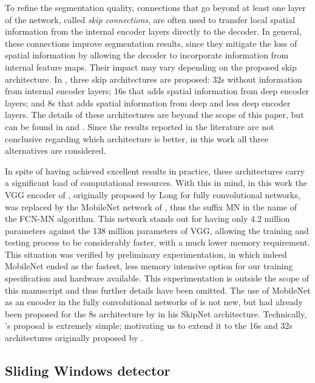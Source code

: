 \documentclass[a4paper,authoryear,review]{elsarticle}
\begin{document}
To refine the segmentation quality, connections that go beyond at least one layer of the network, called \emph{skip connections}, are often used to transfer local spatial information from the internal encoder layers directly to the decoder. In general, these connections improve segmentation results, since they mitigate the loss of spatial information by allowing the decoder to incorporate information from internal feature maps. Their impact may vary depending on the proposed skip architecture. In \citet{long2015fully}, three skip architectures are proposed: 32s without information from internal encoder layers; 16s that adds spatial information from deep encoder layers; and 8s that adds spatial information from deep and less deep encoder layers. The details of these architectures are beyond the scope of this paper, but can be found in \citet{long2015fully} and \citet{shelhamer2017fully}. Since the results reported in the literature are not conclusive regarding which architecture is better, in this work all three alternatives are considered.

In spite of having achieved excellent results in practice, these architectures carry a significant load of computational resources. With this in mind, in this work the VGG encoder of \citet{Simonyan2015VeryDC}, originally proposed by Long for fully convolutional networks, was replaced by the MobileNet network of \citet{howard2017mobilenets},  thus the suffix MN in the name of the FCN-MN algorithm. This network stands out for having only $4.2$ million parameters against the 138 million parameters of VGG, allowing the training and testing process to be considerably faster, with a much lower memory requirement.
This situation was verified by preliminary experimentation, in which indeed MobileNet ended as the fastest, less memory intensive option for our training specification and hardware available. This experimentation is outside the scope of this manuscript and thus further details have been omitted. The use of MobileNet as an encoder in the fully convolutional networks of \citet{long2015fully} is not new, but had already been proposed for the 8s architecture by \citet{siam2018rtseg} in his SkipNet architecture. Technically, \citet{siam2018rtseg}’s proposal is extremely simple; motivating us to extend it to the 16s and 32s architectures originally proposed by \citep{long2015fully}. 

\subsection{Sliding Windows detector}
\label{sec:sw}
\end{document}
